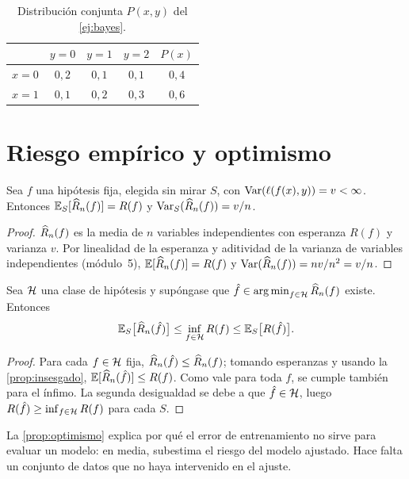 \begin{table}[h]
\centering\small
\caption{Distribución conjunta $P(x,y)$ del \cref{ej:bayes}.}\label{tab:conjunta}
\begin{tabular}{@{}lccc|c@{}}
\toprule
 & $y=0$ & $y=1$ & $y=2$ & $P(x)$ \\
\midrule
$x=0$ & $0{,}2$ & $0{,}1$ & $0{,}1$ & $0{,}4$ \\
$x=1$ & $0{,}1$ & $0{,}2$ & $0{,}3$ & $0{,}6$ \\
\bottomrule
\end{tabular}
\end{table}

\section{Riesgo empírico y optimismo}

\begin{proposicion}\label{prop:insesgado}
Sea $f$ una hipótesis fija, elegida sin mirar $S$, con $\operatorname{Var}(\ell(f(x),y))=v<\infty$. Entonces $\mathbb{E}_S[\widehat{R}_n(f)]=R(f)$ y $\operatorname{Var}_S(\widehat{R}_n(f))=v/n$.
\end{proposicion}

\begin{proof}
$\widehat{R}_n(f)$ es la media de $n$ variables independientes con esperanza $R(f)$ y varianza $v$. Por linealidad de la esperanza y aditividad de la varianza de variables independientes (módulo~5), $\mathbb{E}[\widehat{R}_n(f)]=R(f)$ y $\operatorname{Var}(\widehat{R}_n(f))=n v/n^{2}=v/n$.
\end{proof}

\begin{proposicion}\label{prop:optimismo}
Sea $\mathcal{H}$ una clase de hipótesis y supóngase que $\hat f\in\operatorname*{arg\,min}_{f\in\mathcal{H}}\widehat{R}_n(f)$ existe. Entonces
\[
\mathbb{E}_S\bigl[\widehat{R}_n(\hat f)\bigr]\le\inf_{f\in\mathcal{H}}R(f)\le\mathbb{E}_S\bigl[R(\hat f)\bigr].
\]
\end{proposicion}

\begin{proof}
Para cada $f\in\mathcal{H}$ fija, $\widehat{R}_n(\hat f)\le\widehat{R}_n(f)$; tomando esperanzas y usando la \cref{prop:insesgado}, $\mathbb{E}[\widehat{R}_n(\hat f)]\le R(f)$. Como vale para toda $f$, se cumple también para el ínfimo. La segunda desigualdad se debe a que $\hat f\in\mathcal{H}$, luego $R(\hat f)\ge\inf_{f\in\mathcal{H}}R(f)$ para cada $S$.
\end{proof}

La \cref{prop:optimismo} explica por qué el error de entrenamiento no sirve para evaluar un modelo: en media, subestima el riesgo del modelo ajustado. Hace falta un conjunto de datos que no haya intervenido en el ajuste.

